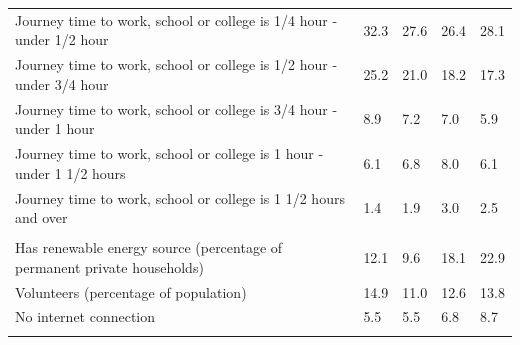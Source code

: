 \documentclass{article}
\begin{document}
\begin{table}[h]
\begin{tabular}{KTTTT}
Journey time to work, school or college is 1/4 hour - under 1/2 hour & 32.3& 27.6& 26.4& 28.1\\
Journey time to work, school or college is 1/2 hour - under 3/4 hour & 25.2& 21.0& 18.2& 17.3\\
Journey time to work, school or college is 3/4 hour - under 1 hour & 8.9& 7.2& 7.0& 5.9\\
Journey time to work, school or college is 1 hour - under 1 1/2 hours & 6.1& 6.8& 8.0& 6.1\\
Journey time to work, school or college is 1 1/2 hours and over & 1.4& 1.9& 3.0& 2.5\\
\hline
    \\ 
    \hline
Has renewable energy source (percentage of permanent private households) & 12.1&  9.6& 18.1& 22.9\\
    \hline
Volunteers (percentage of population) & 14.9& 11.0& 12.6& 13.8\\
    \hline
No internet connection& 5.5& 5.5& 6.8& 8.7\\
\hline
\end{tabular}
\end{table}
\end{document}
